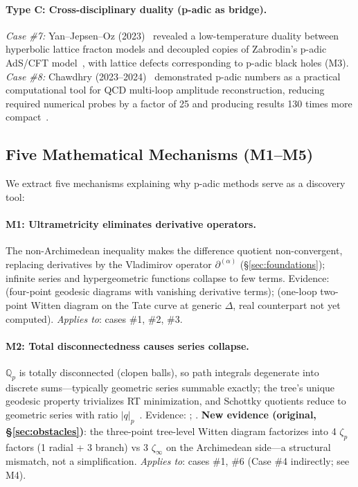 \documentclass[11pt,a4paper]{article}
\newcommand{\Qp}{\mathbb{Q}_p}
\newcommand{\dpartial}{\partial^{(\alpha)}}
\newcommand{\normp}[1]{|#1|_p}
\begin{document}
\paragraph{Type C: Cross-disciplinary duality (p-adic as bridge).}
\textit{Case \#7:} Yan--Jepsen--Oz (2023)~\cite{YJO23} revealed a low-temperature duality between hyperbolic lattice fracton models and decoupled copies of Zabrodin's p-adic AdS/CFT model~\cite{CMZ89}, with lattice defects corresponding to p-adic black holes (M3). \textit{Case \#8:} Chawdhry (2023--2024)~\cite{C23,C24} demonstrated p-adic numbers as a practical computational tool for QCD multi-loop amplitude reconstruction, reducing required numerical probes by a factor of 25 and producing results 130 times more compact~\cite{C23}.

\subsection{Five Mathematical Mechanisms (M1--M5)}
\label{sec:mechanisms}

We extract five mechanisms explaining why p-adic methods serve as a discovery tool:

\paragraph{M1: Ultrametricity eliminates derivative operators.}
The non-Archimedean inequality makes the difference quotient non-convergent, replacing derivatives by the Vladimirov operator $\dpartial$ (\S\ref{sec:foundations}); infinite series and hypergeometric functions collapse to few terms. Evidence: \cite{GP17} (four-point geodesic diagrams with vanishing derivative terms); \cite{HJ24} (one-loop two-point Witten diagram on the Tate curve at generic $\Delta$, real counterpart not yet computed). \emph{Applies to}: cases \#1, \#2, \#3.

\paragraph{M2: Total disconnectedness causes series collapse.}
$\Qp$ is totally disconnected (clopen balls), so path integrals degenerate into discrete sums---typically geometric series summable exactly; the tree's unique geodesic property trivializes RT minimization, and Schottky quotients reduce to geometric series with ratio $\normp{q}$~\cite{CMZ89}. Evidence: \cite{HMPS18}; \cite{CMZ89}. \textbf{New evidence (original, \S\ref{sec:obstacles})}: the three-point tree-level Witten diagram factorizes into 4 $\zeta_p$ factors (1 radial + 3 branch) vs 3 $\zeta_\infty$ on the Archimedean side---a structural mismatch, not a simplification. \emph{Applies to}: cases \#1, \#6 (Case \#4 indirectly; see M4).
\end{document}
